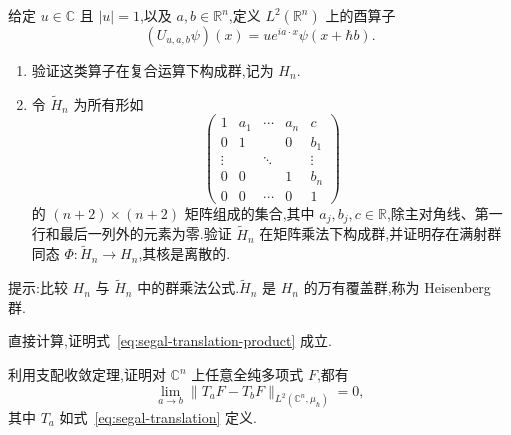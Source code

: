 {\begin{exercise}\label{ex:heisenberg-group}
给定 $u\in\mathbb C$ 且 $|u|=1$,以及 $a,b\in\mathbb R^n$,定义 $L^2(\mathbb R^n)$ 上的酉算子
\[
(U_{u,a,b}\psi)(x)=u e^{ia\cdot x}\psi(x+\hbar b).
\]
\begin{enumerate}
\item 验证这类算子在复合运算下构成群,记为 $H_n$.
\item 令 $\widetilde H_n$ 为所有形如
\[
\begin{pmatrix}
1&a_1&\cdots&a_n&c\\
0&1&&0&b_1\\
\vdots&&\ddots&&\vdots\\
0&0&&1&b_n\\
0&0&\cdots&0&1
\end{pmatrix}
\]
的 $(n+2)\times(n+2)$ 矩阵组成的集合,其中 $a_j,b_j,c\in\mathbb R$,除主对角线、第一行和最后一列外的元素为零.验证 $\widetilde H_n$ 在矩阵乘法下构成群,并证明存在满射群同态 $\Phi:\widetilde H_n\to H_n$,其核是离散的.
\end{enumerate}
提示:比较 $H_n$ 与 $\widetilde H_n$ 中的群乘法公式.$\widetilde H_n$ 是 $H_n$ 的万有覆盖群,称为 Heisenberg 群.
\end{exercise}

\begin{exercise}\label{ex:segal-translation-product}
直接计算,证明式~\eqref{eq:segal-translation-product} 成立.
\end{exercise}

\begin{exercise}\label{ex:segal-translation-continuity}
利用支配收敛定理,证明对 $\mathbb C^n$ 上任意全纯多项式 $F$,都有
\[
\lim_{a\to b}\|T_aF-T_bF\|_{L^2(\mathbb C^n,\mu_\hbar)}=0,
\]
其中 $T_a$ 如式~\eqref{eq:segal-translation} 定义.
\end{exercise}

}

